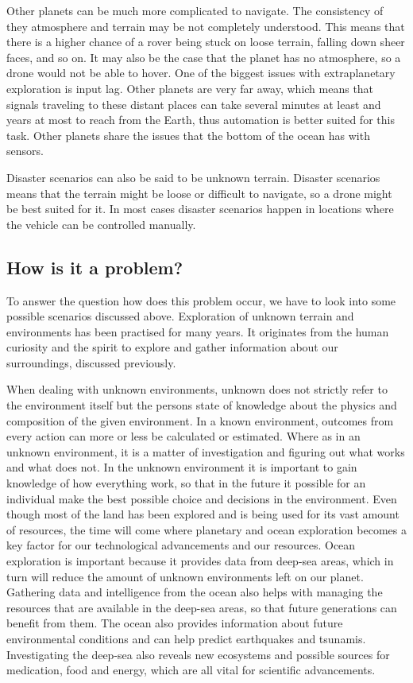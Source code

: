Other planets can be much more complicated to navigate. The consistency of they atmosphere and terrain may be not completely understood. This means that there is a higher chance of a rover being stuck on loose terrain, falling down sheer faces, and so on. It may also be the case that the planet has no atmosphere, so a drone would not be able to hover. One of the biggest issues with extraplanetary exploration is input lag. Other planets are very far away, which means that signals traveling to these distant places can take several minutes at least and years at most to reach from the Earth, thus automation is better suited for this task. Other planets share the issues that the bottom of the ocean has with sensors.

Disaster scenarios can also be said to be unknown terrain. Disaster scenarios means that the terrain might be loose or difficult to navigate, so a drone might be best suited for it. In most cases disaster scenarios happen in locations where the vehicle can be controlled manually.

\subsection{How is it a problem?}

To answer the question how does this problem occur, we have to look into some possible scenarios discussed above. Exploration of unknown terrain and environments has been practised for many years. It originates from the human curiosity and the spirit to explore and gather information about our surroundings, discussed previously.

When dealing with unknown environments, unknown does not strictly refer to the environment itself but the persons state of knowledge about the physics and composition of the given environment. In a known environment, outcomes from every action can more or less be calculated or estimated. Where as in an unknown environment, it is a matter of investigation and figuring out what works and what does not. In the unknown environment it is important to gain knowledge of how everything work, so that in the future it possible for an individual make the best possible choice and decisions in the environment.\cite{aiint}
Even though most of the land has been explored and is being used for its vast amount of resources, the time will come where planetary and ocean exploration becomes a key factor for our technological advancements and our resources. Ocean exploration is important because it provides data from deep-sea areas, which in turn will reduce the amount of unknown environments left on our planet.
Gathering data and intelligence from the ocean also helps with managing the resources that are available in the deep-sea areas, so that future generations can benefit from them. The ocean also provides information about future environmental conditions and can help predict earthquakes and tsunamis. Investigating the deep-sea also reveals new ecosystems and possible sources for medication, food and energy, which are all vital for scientific advancements.\cite{oceanexplo}

